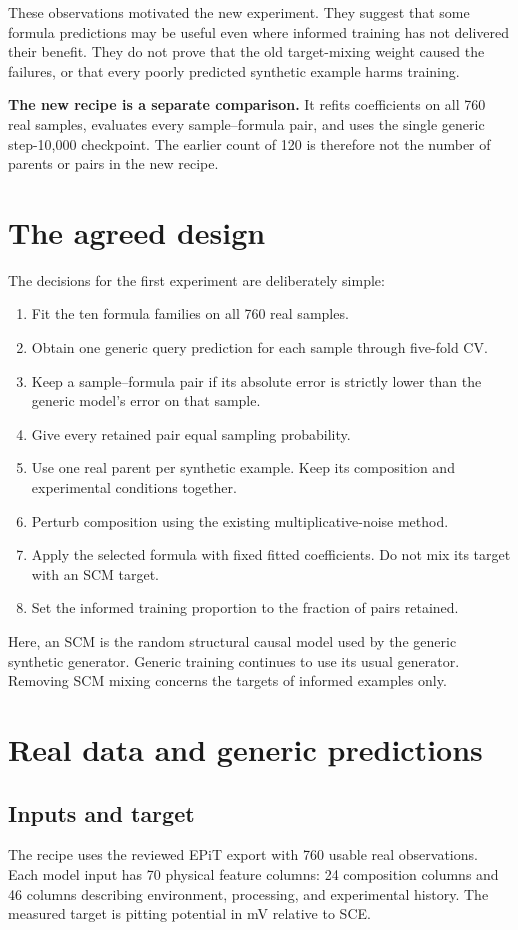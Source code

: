 \documentclass[11pt]{article}
\begin{document}
These observations motivated the new experiment. They suggest that some formula
predictions may be useful even where informed training has not delivered their
benefit. They do not prove that the old target-mixing weight caused the failures,
or that every poorly predicted synthetic example harms training.

\textbf{The new recipe is a separate comparison.} It refits coefficients on all
760 real samples, evaluates every sample--formula pair, and uses the single
generic step-10,000 checkpoint. The earlier count of 120 is therefore not the
number of parents or pairs in the new recipe.

\section{The agreed design}
The decisions for the first experiment are deliberately simple:
\begin{enumerate}
\item Fit the ten formula families on all 760 real samples.
\item Obtain one generic query prediction for each sample through five-fold CV.
\item Keep a sample--formula pair if its absolute error is strictly lower than
      the generic model's error on that sample.
\item Give every retained pair equal sampling probability.
\item Use one real parent per synthetic example. Keep its composition and
      experimental conditions together.
\item Perturb composition using the existing multiplicative-noise method.
\item Apply the selected formula with fixed fitted coefficients. Do not mix its
      target with an SCM target.
\item Set the informed training proportion to the fraction of pairs retained.
\end{enumerate}

Here, an SCM is the random structural causal model used by the generic synthetic
generator. Generic training continues to use its usual generator. Removing SCM
mixing concerns the targets of informed examples only.

\section{Real data and generic predictions}
\subsection{Inputs and target}
The recipe uses the reviewed EPiT export with 760 usable real observations.
Each model input has 70 physical feature columns: 24 composition columns and
46 columns describing environment, processing, and experimental history.
The measured target is pitting potential in mV relative to SCE.
\end{document}
